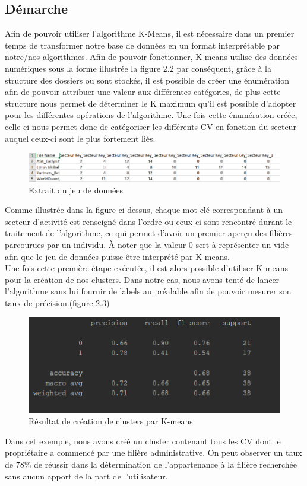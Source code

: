 \documentclass[memoire.tex]{subfiles}
\begin{document}
\subsection{Démarche}
Afin de pouvoir utiliser l'algorithme K-Means, il est nécessaire dans un premier temps de transformer notre base de données en un format interprétable par notre/nos algorithmes. Afin de pouvoir fonctionner, K-means utilise des données numériques sous la forme illustrée la figure 2.2 par conséquent, grâce à la structure des dossiers ou sont stockés, il est possible de créer une énumération afin de pouvoir attribuer une valeur aux différentes catégories, de plus cette structure nous permet de déterminer le K maximum qu’il est possible d’adopter pour les différentes opérations de l’algorithme. Une fois cette énumération créée, celle-ci nous permet donc de catégoriser les différents CV en fonction du secteur auquel ceux-ci sont le plus fortement liés.
	\begin{figure}[h!]
		\centerline{\includegraphics[scale=0.7]{img/data_sample.png}}
		\caption{Extrait du jeu de données}
	\end{figure}

Comme illustrée dans la figure ci-dessus, chaque mot clé correspondant à un secteur d'activité est renseigné dans l'ordre ou ceux-ci sont rencontré durant le traitement de l'algorithme, ce qui permet d'avoir un premier aperçu des filières parcourues par un individu. À noter que la valeur 0 sert à représenter un vide afin que le jeu de données puisse être interprété par K-means.\\
Une fois cette première étape exécutée, il est alors possible d'utiliser K-means pour la création de nos clusters. Dans notre cas, nous avons tenté de lancer l'algorithme sans lui fournir de labels au préalable afin de pouvoir mesurer son taux de précision.(figure 2.3)
	\begin{figure}[h!]
		\centerline{\includegraphics[scale=0.7]{img/result_kmeans.png}}
		\caption{Résultat de création de clusters par K-means}
	\end{figure}
Dans cet exemple, nous avons créé un cluster contenant tous les CV dont le propriétaire a commencé par une filière administrative. On peut observer un taux de 78\% de réussir dans la détermination de l'appartenance à la filière recherchée sans aucun apport de la part de l'utilisateur.
\end{document}
